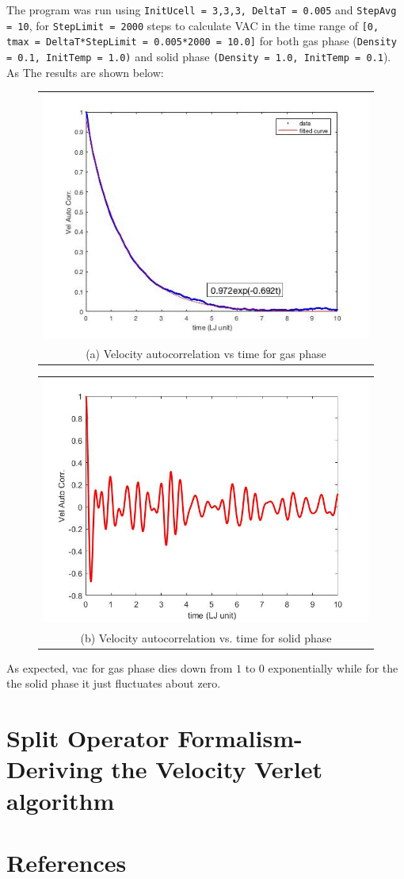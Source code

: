 \documentclass[11pt, oneside]{article}   	%
\begin{document}
The program was run using \texttt{InitUcell = {3,3,3}, DeltaT = 0.005} and \texttt{StepAvg = 10}, for \texttt{StepLimit = 2000} steps to calculate VAC in the time range of \texttt{[0, tmax = DeltaT*StepLimit = 0.005*2000 = 10.0]} for both gas phase (\texttt{Density = 0.1, InitTemp = 1.0)} and solid phase \texttt{(Density = 1.0, InitTemp = 0.1}). As The results are shown below:
	\begin{figure}[!htbp]
	\centering
		\begin{tabular}{@{}c@{}}
		\includegraphics[scale=0.55]{vacGas.jpg} \\[\abovecaptionskip]
		\tiny (a) Velocity autocorrelation vs time for gas phase
		\end{tabular}
		\begin{tabular}{@{}c@{}}
		\includegraphics[scale=0.4]{vacSolid} \\[\abovecaptionskip]
		\tiny (b) Velocity autocorrelation vs. time for solid phase
		\end{tabular}
		
	\end{figure}
	
As expected, vac for gas phase dies down from $1$ to $0$ exponentially while for the the solid phase it just fluctuates about zero.
\pagebreak
\section{Split Operator Formalism- Deriving the Velocity Verlet algorithm}

\pagebreak
\section{References}
\end{document}

